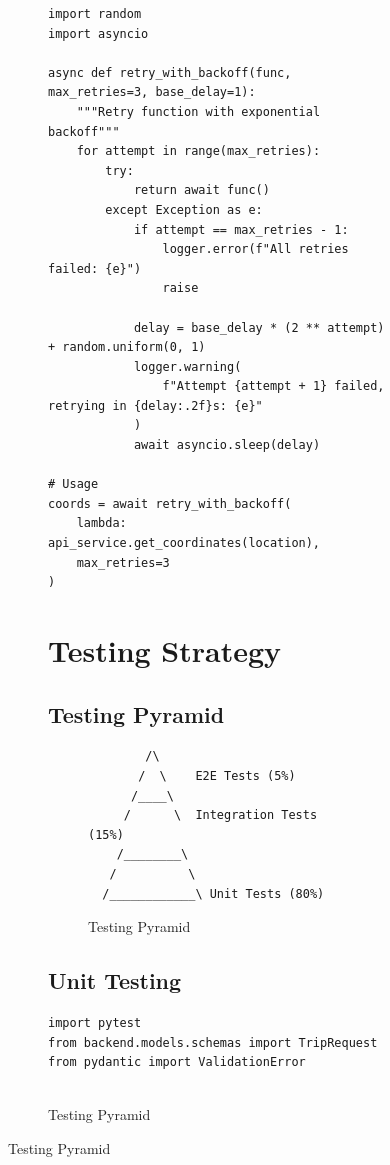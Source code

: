 \documentclass[12pt,a4paper]{report}
\begin{document}
\begin{figure}[H]
\begin{plantuml}
\begin{figure}[H]
\begin{plantuml}
\begin{lstlisting}[style=pythonstyle, caption={Exponential Backoff Retry}]
import random
import asyncio

async def retry_with_backoff(func, max_retries=3, base_delay=1):
    """Retry function with exponential backoff"""
    for attempt in range(max_retries):
        try:
            return await func()
        except Exception as e:
            if attempt == max_retries - 1:
                logger.error(f"All retries failed: {e}")
                raise
            
            delay = base_delay * (2 ** attempt) + random.uniform(0, 1)
            logger.warning(
                f"Attempt {attempt + 1} failed, retrying in {delay:.2f}s: {e}"
            )
            await asyncio.sleep(delay)

# Usage
coords = await retry_with_backoff(
    lambda: api_service.get_coordinates(location),
    max_retries=3
)
\end{lstlisting}


\chapter{Testing Strategy}

\section{Testing Pyramid}

\begin{figure}[H]
    \centering
    \begin{verbatim}
        /\
       /  \    E2E Tests (5%)
      /____\   
     /      \  Integration Tests (15%)
    /________\ 
   /          \
  /____________\ Unit Tests (80%)
    \end{verbatim}
    \caption{Testing Pyramid}
    \label{fig:testing-pyramid}
\end{figure}

\section{Unit Testing}

\begin{lstlisting}[style=pythonstyle, caption={Unit Test Examples with pytest}]
import pytest
from backend.models.schemas import TripRequest
from pydantic import ValidationError


\end{lstlisting}
\end{plantuml}
\end{figure}
\end{plantuml}
\end{figure}
\end{document}
